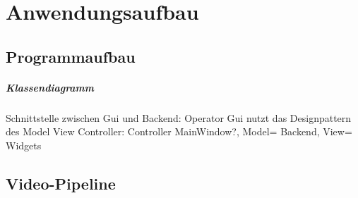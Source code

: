 \chapter{Anwendungsaufbau}
\label{ch:anwendungsaufbau}

\section{Programmaufbau}

\paragraph{Klassendiagramm}


Schnittstelle zwischen Gui und Backend: Operator
Gui nutzt das Designpattern des Model View Controller: Controller MainWindow?, Model= Backend, View= Widgets


\section{Video-Pipeline}

